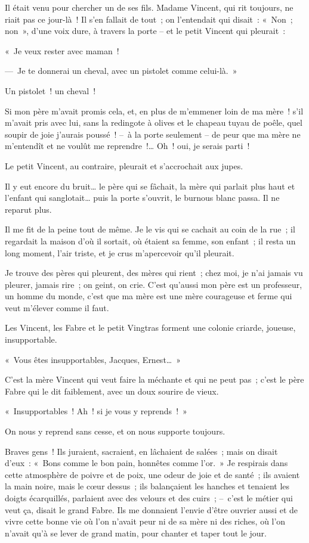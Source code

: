 \documentclass[french,twoside]{book} %
\begin{document}
Il était venu pour chercher un de ses fils. Madame Vincent, qui rit toujours, ne riait pas ce jour-là ! Il s’en fallait de tout ; on l’entendait qui disait : « Non ; non », d’une voix dure, à travers la porte – et le petit Vincent qui pleurait :\par
« Je veux rester avec maman !\par
— Je te donnerai un cheval, avec un pistolet comme celui-là. »\par
Un pistolet ! un cheval !\par
Si mon père m’avait promis cela, et, en plus de m’emmener loin de ma mère ! s’il m’avait pris avec lui, sans la redingote à olives et le chapeau tuyau de poêle, quel soupir de joie j’aurais poussé ! – à la porte seulement – de peur que ma mère ne m’entendît et ne voulût me reprendre !… Oh ! oui, je serais parti !\par
Le petit Vincent, au contraire, pleurait et s’accrochait aux jupes.\par
Il y eut encore du bruit… le père qui se fâchait, la mère qui parlait plus haut et l’enfant qui sanglotait… puis la porte s’ouvrit, le burnous blanc passa. Il ne reparut plus.\par
Il me fit de la peine tout de même. Je le vis qui se cachait au coin de la rue ; il regardait la maison d’où il sortait, où étaient sa femme, son enfant ; il resta un long moment, l’air triste, et je crus m’apercevoir qu’il pleurait.\par
Je trouve des pères qui pleurent, des mères qui rient ; chez moi, je n’ai jamais vu pleurer, jamais rire ; on geint, on crie. C’est qu’aussi mon père est un professeur, un homme du monde, c’est que ma mère est une mère courageuse et ferme qui veut m’élever comme il faut.\par
\bigbreak
\noindent Les Vincent, les Fabre et le petit Vingtras forment une colonie criarde, joueuse, insupportable.\par
« Vous êtes insupportables, Jacques, Ernest… »\par
C’est la mère Vincent qui veut faire la méchante et qui ne peut pas ; c’est le père Fabre qui le dit faiblement, avec un doux sourire de vieux.\par
« Insupportables ! Ah ! si je vous y reprends ! »\par
On nous y reprend sans cesse, et on nous supporte toujours.\par
Braves gens ! Ils juraient, sacraient, en lâchaient de salées ; mais on disait d’eux : « Bons comme le bon pain, honnêtes comme l’or. » Je respirais dans cette atmosphère de poivre et de poix, une odeur de joie et de santé ; ils avaient la main noire, mais le cœur dessus ; ils balançaient les hanches et tenaient les doigts écarquillés, parlaient avec des velours et des cuirs ; – c’est le métier qui veut ça, disait le grand Fabre. Ils me donnaient l’envie d’être ouvrier aussi et de vivre cette bonne vie où l’on n’avait peur ni de sa mère ni des riches, où l’on n’avait qu’à se lever de grand matin, pour chanter et taper tout le jour.\par
\end{document}
